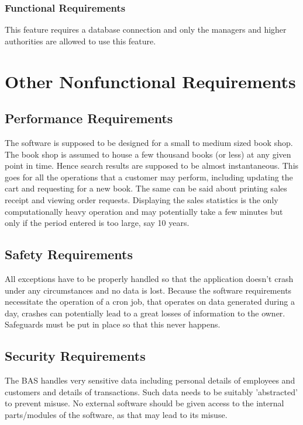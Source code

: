 \documentclass{scrreprt}
\begin{document}
\subsection{Functional Requirements}
This feature requires a database connection and only the managers and higher authorities are allowed to use this feature. 


\chapter{Other Nonfunctional Requirements}

\section{Performance Requirements}

The software is supposed to be designed for a small to medium sized book shop. The book shop is assumed to house a few thousand books (or less) at any given point in time. Hence search results are supposed to be almost instantaneous. This goes for all the operations that a customer may perform, including updating the cart and requesting for a new book. The same can be said about printing sales receipt and viewing order requests. Displaying the sales statistics is the only computationally heavy operation and may potentially take a few minutes but only if the period entered is too large, say 10 years.

\section{Safety Requirements}
All exceptions have to be properly handled so that the application doesn't crash under any circumstances and no data is lost. Because the software requirements necessitate the operation of a cron job, that operates on data generated during a day, crashes can potentially lead to a great losses of information to the owner. Safeguards must be put in place so that this never happens.

\section{Security Requirements}
The BAS handles very sensitive data including personal details of employees and customers and details of transactions. Such data needs to be suitably 'abstracted' to prevent misuse. No external software should be given access to the internal parts/modules of the software, as that may lead to its misuse. 
\end{document}

